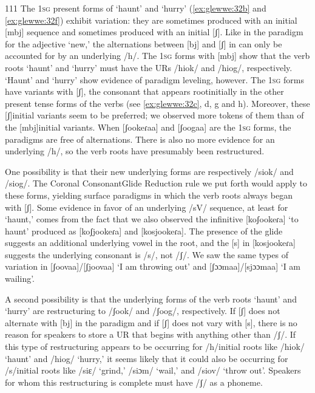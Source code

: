 \documentclass[output=paper]{langsci/langscibook}
\begin{document}
\begin{tabular}{111}
The 1\textsc{sg} present forms of ‘haunt’ and ‘hurry’ (\ref{ex:glewwe:32b} and \ref{ex:glewwe:32f}) exhibit variation: they are sometimes produced with an initial [mbj] sequence and sometimes produced with an initial [ʃ]. Like in the paradigm for the adjective ‘new,’ the alternations between [bj] and [ʃ] in  can only be accounted for by an underlying /h/. The 1\textsc{sg} forms with [mbj] show that the verb roots ‘haunt’ and ‘hurry’ must have the URs /hiok/ and /hiog/, respectively. ‘Haunt’ and ‘hurry’ show evidence of paradigm leveling, however. The 1\textsc{sg} forms have variants with [ʃ], the consonant that appears rootinitially in the other present tense forms of the verbs (see \ref{ex:glewwe:32c}, d, g and h). Moreover, these [ʃ]initial variants seem to be preferred; we observed more tokens of them than of the [mbj]initial variants. When [ʃookeɾaa] and [ʃoogaa] are the 1\textsc{sg} forms, the paradigms are free of alternations. There is also no more evidence for an underlying /h/, so the verb roots have presumably been restructured. 

One possibility is that their new underlying forms are respectively /siok/ and /siog/. The Coronal ConsonantGlide Reduction rule we put forth would apply to these forms, yielding surface paradigms in which the verb roots always began with [ʃ]. Some evidence in favor of an underlying /sV/ sequence, at least for ‘haunt,’ comes from the fact that we also observed the infinitive [koʃookeɾa] ‘to haunt’ produced as [koʃjookeɾa] and [kosjookeɾa]. The presence of the glide suggests an additional underlying vowel in the root, and the [s] in [kosjookeɾa] suggests the underlying consonant is /s/, not /ʃ/. We saw the same types of variation in [ʃoovaa]/[ʃjoovaa] ‘I am throwing out’ and [ʃɔɔmaa]/[sjɔɔmaa] ‘I am wailing’. 

A second possibility is that the underlying forms of the verb roots ‘haunt’ and ‘hurry’ are restructuring to /ʃook/ and /ʃoog/, respectively. If [ʃ] does not alternate with [bj] in the paradigm and if [ʃ] does not vary with [s], there is no reason for speakers to store a UR that begins with anything other than /ʃ/. If this type of restructuring appears to be occurring for /h/initial roots like /hiok/ ‘haunt’ and /hiog/ ‘hurry,’ it seems likely that it could also be occurring for /s/initial roots like /siɛ/ ‘grind,’ /siɔm/ ‘wail,’ and /siov/ ‘throw out’. Speakers for whom this restructuring is complete must have /ʃ/ as a phoneme. 


\end{tabular}
\end{document}
